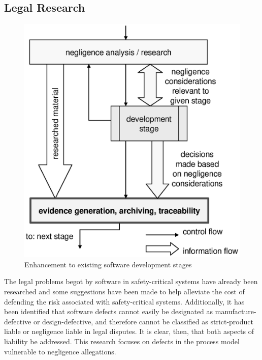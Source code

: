 \subsection{Legal Research}
\begin{figure}
\begin{center}
\includegraphics[scale=0.66]{images/enhancement.eps}
\end{center}
\caption{Enhancement to existing software development stages}
\label{fig:enhancement}
\end{figure}

The legal problems begot by software in safety-critical systems have already
been researched \cite{Turner1996, Turner2000} and some suggestions have been
made to help alleviate the cost of defending the risk associated with
safety-critical systems\cite{Turner2001}. Additionally, it has been identified
that software defects cannot easily be designated as manufacture-defective or
design-defective\cite{Turner2000}, and therefore cannot be classified as
strict-product liable or negligence liable in legal disputes. It is clear, then,
that both aspects of liability be addressed. This research focuses on defects in
the process model vulnerable to negligence allegations.
 
